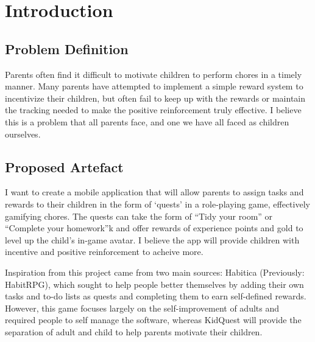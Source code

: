

\chapter{Introduction}
\label{chap:intro}

\section{Problem Definition}
Parents often find it difficult to motivate children to perform chores in a timely manner. 
Many parents have attempted to implement a simple reward system to incentivize their children, but often fail to keep up with the rewards or maintain the tracking needed to make the positive reinforcement truly effective.
I believe this is a problem that all parents face, and one we have all faced as children ourselves.  

\section{Proposed Artefact}
I want to create a mobile application that will allow parents to assign tasks and rewards to their children in the form of `quests' in a role-playing game, effectively gamifying chores. 
The quests can take the form of ``Tidy your room'' or ``Complete your homework''k and offer rewards of experience points and gold to level up the child's in-game avatar. 
I believe the app will provide children with incentive and positive reinforcement to acheive more.

Inspiration from this project came from two main sources: Habitica (Previously: HabitRPG), which sought to help people better themselves by adding their own tasks and to-do lists as quests and completing them to earn self-defined rewards. 
However, this game focuses largely on the self-improvement of adults and required people to self manage the software, whereas KidQuest will provide the separation of adult and child to help parents motivate their children.

